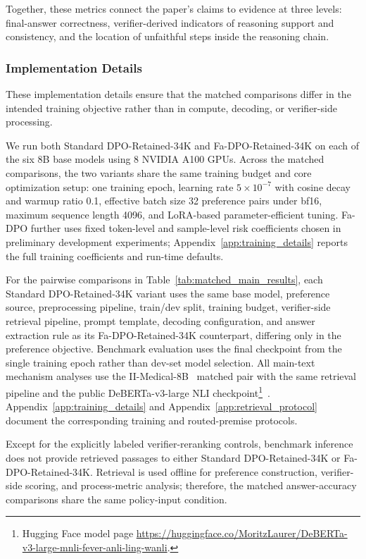 \documentclass[a4paper,fleqn,doubleblind]{cas-sc}
\begin{document}
Together, these metrics connect the paper's claims to evidence at three levels: final-answer correctness, verifier-derived indicators of reasoning support and consistency, and the location of unfaithful steps inside the reasoning chain.

\subsubsection{Implementation Details}
These implementation details ensure that the matched comparisons differ in the intended training objective rather than in compute, decoding, or verifier-side processing.

We run both Standard DPO-Retained-34K and Fa-DPO-Retained-34K on each of the six 8B base models using 8 NVIDIA A100 GPUs. Across the matched comparisons, the two variants share the same training budget and core optimization setup: one training epoch, learning rate $5\times10^{-7}$ with cosine decay and warmup ratio 0.1, effective batch size 32 preference pairs under bf16, maximum sequence length 4096, and LoRA-based parameter-efficient tuning. Fa-DPO further uses fixed token-level and sample-level risk coefficients chosen in preliminary development experiments; Appendix~\ref{app:training_details} reports the full training coefficients and run-time defaults.

For the pairwise comparisons in Table~\ref{tab:matched_main_results}, each Standard DPO-Retained-34K variant uses the same base model, preference source, preprocessing pipeline, train/dev split, training budget, verifier-side retrieval pipeline, prompt template, decoding configuration, and answer extraction rule as its Fa-DPO-Retained-34K counterpart, differing only in the preference objective. Benchmark evaluation uses the final checkpoint from the single training epoch rather than dev-set model selection. All main-text mechanism analyses use the II-Medical-8B~\cite{intelligentinternet2025iimedical8b} matched pair with the same retrieval pipeline and the public DeBERTa-v3-large NLI checkpoint\footnote{Hugging Face model page \url{https://huggingface.co/MoritzLaurer/DeBERTa-v3-large-mnli-fever-anli-ling-wanli}.}~\cite{he2023debertav3,laurer2023less}. Appendix~\ref{app:training_details} and Appendix~\ref{app:retrieval_protocol} document the corresponding training and routed-premise protocols.

Except for the explicitly labeled verifier-reranking controls, benchmark inference does not provide retrieved passages to either Standard DPO-Retained-34K or Fa-DPO-Retained-34K. Retrieval is used offline for preference construction, verifier-side scoring, and process-metric analysis; therefore, the matched answer-accuracy comparisons share the same policy-input condition.
\end{document}
